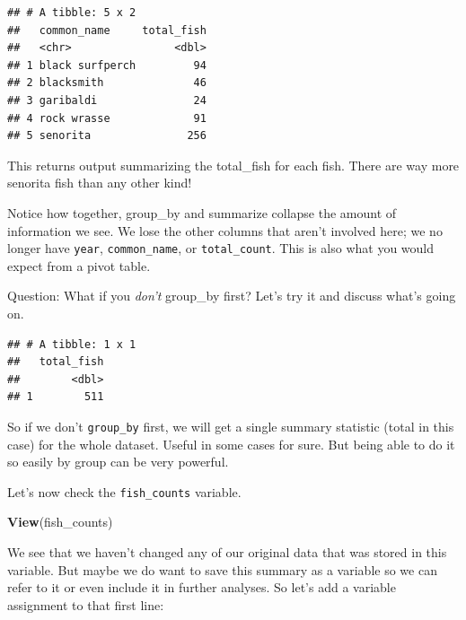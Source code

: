\documentclass[]{book}
\newenvironment{Shaded}{\begin{snugshade}}{\end{snugshade}}
\newcommand{\DataTypeTok}[1]{\textcolor[rgb]{0.13,0.29,0.53}{#1}}
\newcommand{\KeywordTok}[1]{\textcolor[rgb]{0.13,0.29,0.53}{\textbf{#1}}}
\newcommand{\NormalTok}[1]{#1}
\newcommand{\OperatorTok}[1]{\textcolor[rgb]{0.81,0.36,0.00}{\textbf{#1}}}
\newcommand{\StringTok}[1]{\textcolor[rgb]{0.31,0.60,0.02}{#1}}
\begin{document}
\begin{verbatim}
## # A tibble: 5 x 2
##   common_name     total_fish
##   <chr>                <dbl>
## 1 black surfperch         94
## 2 blacksmith              46
## 3 garibaldi               24
## 4 rock wrasse             91
## 5 senorita               256
\end{verbatim}

This returns output summarizing the total\_fish for each fish. There are way more senorita fish than any other kind!

Notice how together, group\_by and summarize collapse the amount of information we see. We lose the other columns that aren't involved here; we no longer have \texttt{year}, \texttt{common\_name}, or \texttt{total\_count}. This is also what you would expect from a pivot table.

Question: What if you \emph{don't} group\_by first? Let's try it and discuss what's going on.

\begin{Shaded}
\end{Shaded}

\begin{verbatim}
## # A tibble: 1 x 1
##   total_fish
##        <dbl>
## 1        511
\end{verbatim}

So if we don't \texttt{group\_by} first, we will get a single summary statistic (total in this case) for the whole dataset. Useful in some cases for sure. But being able to do it so easily by group can be very powerful.

Let's now check the \texttt{fish\_counts} variable.

\begin{Shaded}
\begin{Highlighting}[]
\KeywordTok{View}\NormalTok{(fish_counts)}
\end{Highlighting}
\end{Shaded}

We see that we haven't changed any of our original data that was stored in this variable. But maybe we do want to save this summary as a variable so we can refer to it or even include it in further analyses. So let's add a variable assignment to that first line:
\end{document}
